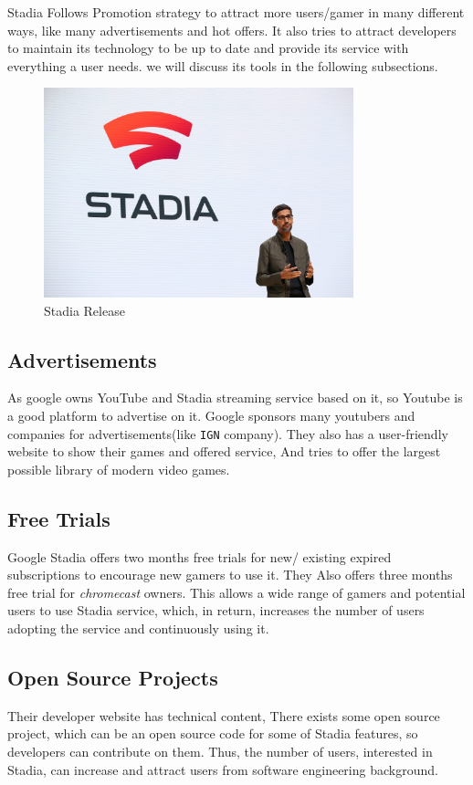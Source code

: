 Stadia Follows  Promotion strategy to attract more users/gamer in many different ways,
like many advertisements and hot offers. It also tries to attract developers to maintain its technology to be up to date and provide its service with everything a user needs.
we will discuss its tools in the following subsections.

\begin{figure}[h]
    \centering
    \includegraphics[width=0.8\textwidth]{images/release.jpeg}
    \caption{Stadia Release}
    \label{fig:release}
\end{figure}

\subsection{Advertisements}
As google owns YouTube and Stadia streaming service based on it, so Youtube is a good platform to advertise on it. Google sponsors many youtubers and companies for advertisements(like \texttt{IGN} company). They also has a user-friendly website to show their games and offered service, And tries to offer the largest possible library of modern video games.

\subsection{Free Trials}
Google Stadia offers two months free trials for new/ existing expired subscriptions to encourage new gamers to use it. They Also offers three months free trial for \emph{chromecast} owners. This allows a wide range of gamers and potential users to use Stadia service, which, in return, increases the number of users adopting the service and continuously using it.

\subsection{Open Source Projects}
Their developer website has technical content, There exists some open source project, which can be an open source code for some of Stadia features, so developers can contribute on them. Thus, the number of users, interested in Stadia, can increase and attract users from software engineering background.